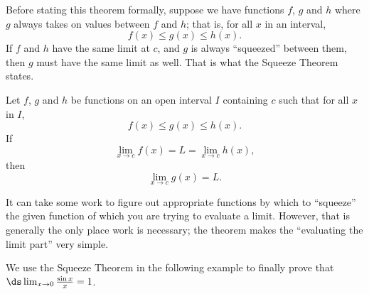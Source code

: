 Before stating this theorem formally, suppose we have functions $f$, $g$ and $h$ where $g$ always takes on values between $f$ and $h$; that is, for all $x$ in an interval, $$f(x) \leq g(x) \leq h(x).$$ If $f$ and $h$ have the same limit at $c$, and $g$  is always ``squeezed'' between them, then $g$ must have the same limit as well. That is what the Squeeze Theorem states.

{Let $f$, $g$ and $h$ be functions on an open interval $I$ containing $c$ such that for all $x$ in $I$, $$f(x)\leq g(x) \leq h(x).$$ If $$\lim_{x\to c} f(x) = L = \lim_{x\to c} h(x),$$ then $$\lim_{x\to c} g(x) = L.$$ 
}

It can take some work to figure out appropriate functions by which to ``squeeze'' the given function of which you are trying to evaluate a limit. However, that is generally the only place work is necessary; the theorem makes the ``evaluating the limit part'' very simple. 

We use the Squeeze Theorem in the following example to finally prove that $\ds \lim_{x\to 0} \frac{\sin x}{x} = 1$.\\

